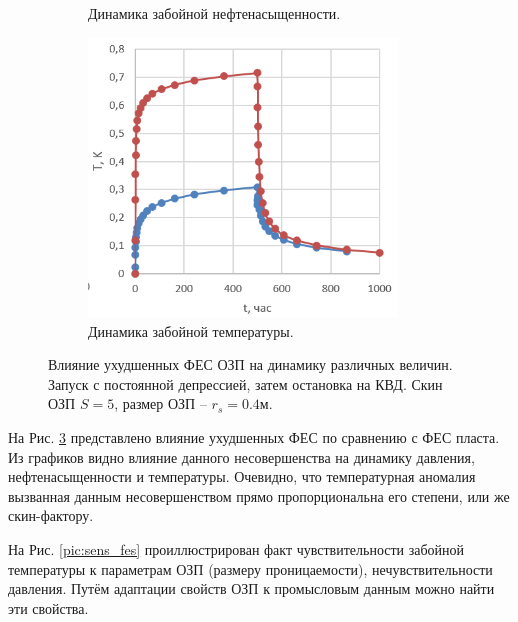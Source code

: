 \begin{figure}[H]
\begin{subfigure}[b]{0.5\textwidth}
		\caption{Динамика забойной нефтенасыщенности.}
		\label{pic:sat_fes}
	\end{subfigure}
	\begin{subfigure}[b]{0.5\textwidth}
		\centering
		\includegraphics[width=0.9\textwidth]{pic/temp_fes.png}
		\caption{Динамика забойной температуры.}
		\label{pic:temp_fes}
	\end{subfigure}
	\caption{Влияние ухудшенных ФЕС ОЗП на динамику различных величин. Запуск с постоянной депрессией, затем остановка на КВД. Скин ОЗП $S=5$, размер ОЗП -- $r_s=0.4 \text{м}$.}
	\label{pic:fes}
\end{figure}

	На Рис. \ref{pic:fes} представлено влияние ухудшенных ФЕС по сравнению с ФЕС пласта. Из графиков видно влияние данного несовершенства на динамику давления, нефтенасыщенности и температуры.
	Очевидно, что температурная аномалия вызванная данным несовершенством прямо пропорциональна его степени, или же скин-фактору.

	На Рис. \ref{pic:sens_fes} проиллюстрирован факт чувствительности забойной температуры к параметрам ОЗП (размеру проницаемости), нечувствительности давления. Путём адаптации свойств ОЗП к промысловым данным можно найти эти свойства.
	
